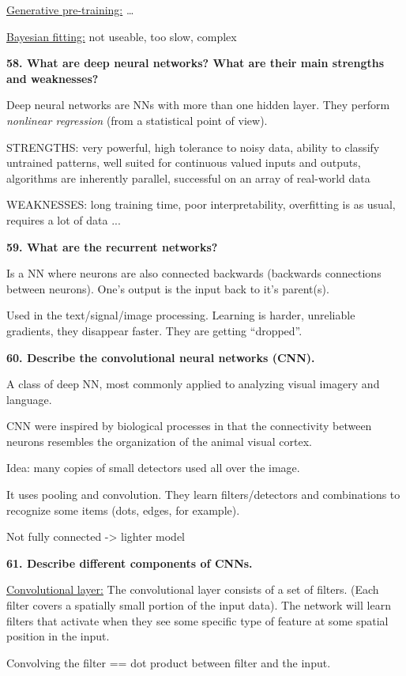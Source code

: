 \underline{Generative pre-training:} \ldots{}

\underline{Bayesian fitting:} not useable, too slow, complex

\textbf{58. What are deep neural networks? What are their main strengths
and weaknesses?}

Deep neural networks are NNs with more than one hidden layer. They
perform \emph{nonlinear regression} (from a statistical point of view).

STRENGTHS: very powerful, high tolerance to noisy data, ability to
classify untrained patterns, well suited for continuous valued inputs
and outputs, algorithms are inherently parallel, successful on an array
of real-world data

WEAKNESSES: long training time, poor interpretability, overfitting is as
usual, requires a lot of data ...

\textbf{59. What are the recurrent networks?}

Is a NN where neurons are also connected backwards (backwards
connections between neurons). One's output is the input back to it's
parent(s).

Used in the text/signal/image processing. Learning is harder, unreliable
gradients, they disappear faster. They are getting ``dropped''.

\textbf{60. Describe the convolutional neural networks (CNN).}

A class of deep NN, most commonly applied to analyzing visual imagery
and language.

CNN were inspired by biological processes in that the connectivity
between neurons resembles the organization of the animal visual cortex.

Idea: many copies of small detectors used all over the image.

It uses pooling and convolution. They learn filters/detectors and
combinations to recognize some items (dots, edges, for example).

Not fully connected -\textgreater{} lighter model

\textbf{61. Describe different components of CNNs.}

\underline{Convolutional layer:} The convolutional layer consists of a
set of filters. (Each filter covers a spatially small portion of the
input data). The network will learn filters that activate when they see
some specific type of feature at some spatial position in the input.

Convolving the filter == dot product between filter and the input.

